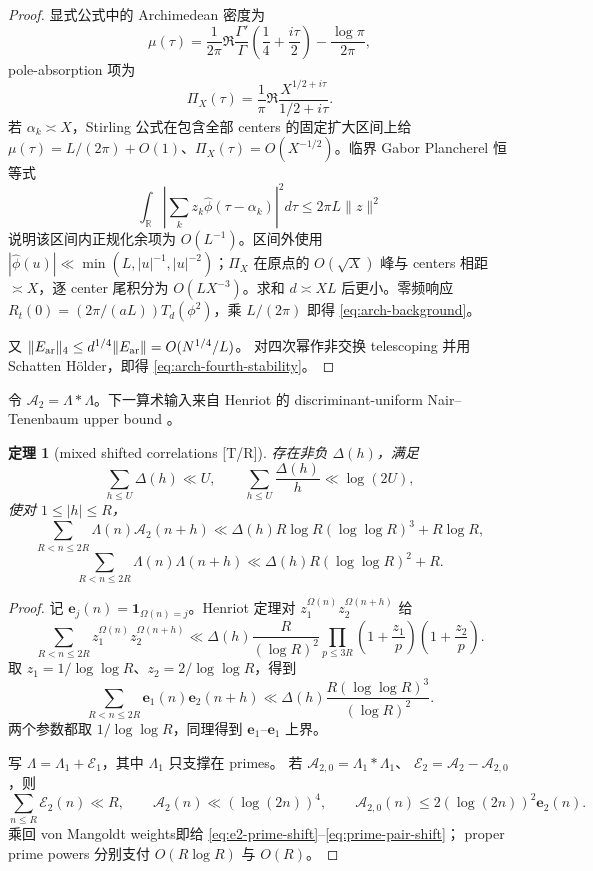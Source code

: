 \documentclass[UTF8,11pt,a4paper]{ctexart}
\newtheorem{theorem}{定理}[section]
\theoremstyle{definition}
\theoremstyle{remark}
\begin{document}
\begin{proof}
显式公式中的 Archimedean 密度为
\[
 \mu(\tau)=\frac1{2\pi}\Re\frac{\Gamma'}{\Gamma}
 \left(\frac14+\frac{i\tau}{2}\right)-\frac{\log\pi}{2\pi},
\]
pole-absorption 项为
\[
 \Pi_X(\tau)=\frac1\pi\Re\frac{X^{1/2+i\tau}}{1/2+i\tau}.
\]
若 $\alpha_k\asymp X$，Stirling 公式在包含全部 centers 的固定扩大区间上给
$\mu(\tau)=L/(2\pi)+O(1)$、$\Pi_X(\tau)=O(X^{-1/2})$。临界 Gabor
Plancherel 恒等式
\[
 \int_{\mathbb R}\left|\sum_kz_k\widehat\phi(\tau-\alpha_k)\right|^2d\tau
 \le2\pi L\|z\|^2
\]
说明该区间内正规化余项为 $O(L^{-1})$。区间外使用
$|\widehat\phi(u)|\ll\min(L,|u|^{-1},|u|^{-2})$；$\Pi_X$ 在原点的
$O(\sqrt X)$ 峰与 centers 相距 $\asymp X$，逐 center 尾积分为
$O(LX^{-3})$。求和 $d\asymp XL$ 后更小。零频响应
$R_t(0)=(2\pi/(aL))T_d(\phi^2)$，乘 $L/(2\pi)$ 即得
\eqref{eq:arch-background}。

又 $\|E_{\rm ar}\|_4\le d^{1/4}\|E_{\rm ar}\|=O(N^{1/4}/L)$。
对四次幂作非交换 telescoping 并用 Schatten H\"older，即得
\eqref{eq:arch-fourth-stability}。
\end{proof}

令 $\mathcal A_2=\Lambda*\Lambda$。下一算术输入来自 Henriot 的
discriminant-uniform Nair--Tenenbaum upper bound \cite{Henriot}。

\begin{theorem}[mixed shifted correlations {[T/R]}]
\label{thm:mixed-shifted}
存在非负 $\Delta(h)$，满足
\[
 \sum_{h\le U}\Delta(h)\ll U,\qquad
 \sum_{h\le U}\frac{\Delta(h)}h\ll\log(2U),
\]
使对 $1\le|h|\le R$，
\[
 \sum_{R<n\le2R}\Lambda(n)\mathcal A_2(n+h)
 \ll
 \Delta(h)R\log R(\log\log R)^3+R\log R,
 \label{eq:e2-prime-shift}
\]
\[
 \sum_{R<n\le2R}\Lambda(n)\Lambda(n+h)
 \ll
 \Delta(h)R(\log\log R)^2+R.
 \label{eq:prime-pair-shift}
\]
\end{theorem}

\begin{proof}
记 $\mathbf e_j(n)=\mathbf1_{\Omega(n)=j}$。Henriot 定理对
$z_1^{\Omega(n)}z_2^{\Omega(n+h)}$ 给
\[
 \sum_{R<n\le2R}z_1^{\Omega(n)}z_2^{\Omega(n+h)}
 \ll
 \Delta(h)\frac R{(\log R)^2}
 \prod_{p\le3R}\left(1+\frac{z_1}p\right)
 \left(1+\frac{z_2}p\right).
\]
取 $z_1=1/\log\log R$、$z_2=2/\log\log R$，得到
\[
 \sum_{R<n\le2R}\mathbf e_1(n)\mathbf e_2(n+h)
 \ll
 \Delta(h)\frac{R(\log\log R)^3}{(\log R)^2}.
\]
两个参数都取 $1/\log\log R$，同理得到
$\mathbf e_1$--$\mathbf e_1$ 上界。

写 $\Lambda=\Lambda_1+\mathcal E_1$，其中 $\Lambda_1$ 只支撑在 primes。
若 $\mathcal A_{2,0}=\Lambda_1*\Lambda_1$、
$\mathcal E_2=\mathcal A_2-\mathcal A_{2,0}$，则
\[
 \sum_{n\le R}\mathcal E_2(n)\ll R,\qquad
 \mathcal A_2(n)\ll(\log(2n))^4,\qquad
 \mathcal A_{2,0}(n)\le2(\log(2n))^2\mathbf e_2(n).
\]
乘回 von Mangoldt weights即给
\eqref{eq:e2-prime-shift}--\eqref{eq:prime-pair-shift}；
proper prime powers 分别支付 $O(R\log R)$ 与 $O(R)$。
\end{proof}
\end{document}
